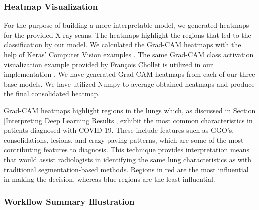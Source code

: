 \subsubsection{Heatmap Visualization}

For the purpose of building a more interpretable model, we generated heatmaps for the provided X-ray scans. The heatmaps highlight the regions that led to the classification by our model. We calculated the Grad-CAM heatmaps with the help of Keras' Computer Vision examples \cite{KCV}. The same Grad-CAM class activation visualization example provided by François Chollet is utilized in our implementation \cite{KGM}. We have generated Grad-CAM heatmaps from each of our three base models. We have utilized Numpy \cite{NUM} to average obtained heatmaps and produce the final consolidated heatmap.

Grad-CAM heatmaps highlight regions in the lungs which, as discussed in Section \ref{Interpreting Deep Learning Results}, exhibit the most common characteristics in patients diagnosed with COVID-19. These include features such as GGO’s, consolidations, lesions, and crazy-paving patterns, which are some of the most contributing features to diagnosis. This technique provides interpretation means that would assist radiologists in identifying the same lung characteristics as with traditional segmentation-based methods. Regions in red are the most influential in making the decision, whereas blue regions are the least influential.


\subsubsection{Workflow Summary Illustration}

